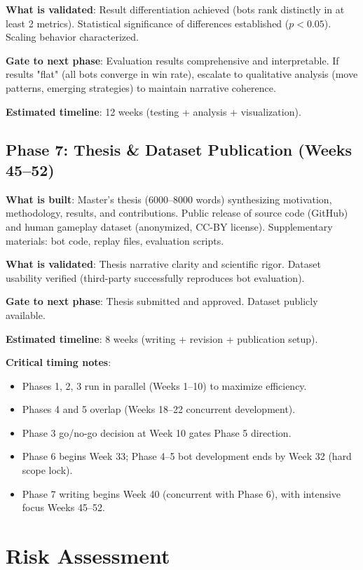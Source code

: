 \documentclass[11pt,a4paper]{article}
\begin{document}
\textbf{What is validated}: Result differentiation achieved (bots rank distinctly in at least 2 metrics). Statistical significance of differences established ($p < 0.05$). Scaling behavior characterized.

\textbf{Gate to next phase}: Evaluation results comprehensive and interpretable. If results "flat" (all bots converge in win rate), escalate to qualitative analysis (move patterns, emerging strategies) to maintain narrative coherence.

\textbf{Estimated timeline}: 12 weeks (testing + analysis + visualization).

\subsection*{Phase 7: Thesis \& Dataset Publication (Weeks 45--52)}
\textbf{What is built}: Master's thesis (6000--8000 words) synthesizing motivation, methodology, results, and contributions. Public release of source code (GitHub) and human gameplay dataset (anonymized, CC-BY license). Supplementary materials: bot code, replay files, evaluation scripts.

\textbf{What is validated}: Thesis narrative clarity and scientific rigor. Dataset usability verified (third-party successfully reproduces bot evaluation).

\textbf{Gate to next phase}: Thesis submitted and approved. Dataset publicly available.

\textbf{Estimated timeline}: 8 weeks (writing + revision + publication setup).

\textbf{Critical timing notes}: 
\begin{itemize}
    \item Phases 1, 2, 3 run in parallel (Weeks 1--10) to maximize efficiency.
    \item Phases 4 and 5 overlap (Weeks 18--22 concurrent development).
    \item Phase 3 go/no-go decision at Week 10 gates Phase 5 direction.
    \item Phase 6 begins Week 33; Phase 4--5 bot development ends by Week 32 (hard scope lock).
    \item Phase 7 writing begins Week 40 (concurrent with Phase 6), with intensive focus Weeks 45--52.
\end{itemize}

\section{Risk Assessment}
\label{sec:risks}
\end{document}
